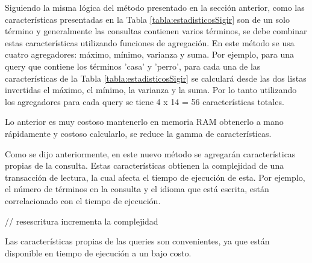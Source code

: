 Siguiendo la misma lógica del método presentado en la sección anterior, como las características presentadas en la Tabla \ref{tabla:estadisticosSigir} son de un solo término y generalmente las consultas contienen varios términos, se debe combinar estas características utilizando funciones de agregación. En este método se usa cuatro agregadores: máximo, mínimo, varianza y suma. Por ejemplo, para una query que contiene los términos 'casa' y 'perro', para cada una de las características de la Tabla \ref{tabla:estadisticosSigir} se calculará desde las dos listas invertidas el máximo, el mínimo, la varianza y la suma. Por lo tanto utilizando los agregadores para cada query se tiene 4 x 14 = 56 características totales.

Lo anterior es muy costoso mantenerlo en memoria RAM  obtenerlo a mano rápidamente y costoso calcularlo, se reduce la gamma de características.


Como se dijo anteriormente, en este nuevo método se agregarán características propias de la consulta. Estas características obtienen la complejidad de una transacción de lectura, la cual afecta el tiempo de ejecución de esta. Por ejemplo, el número de términos en la consulta y el idioma que está escrita, están correlacionado con el tiempo de ejecución. 

// resescritura incrementa la complejidad 

Las características propias de las queries son convenientes, ya que están disponible en tiempo de ejecución a un bajo costo. 


